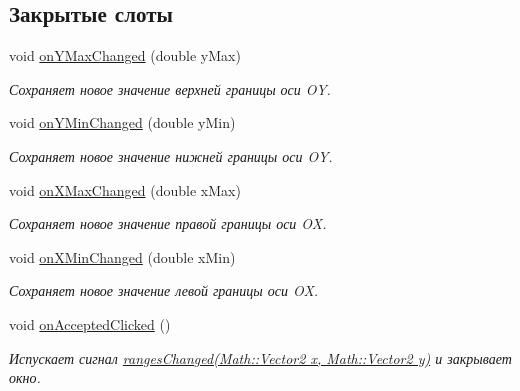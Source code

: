 \subsection*{Закрытые слоты}
\begin{DoxyCompactItemize}
\item 
\hypertarget{class_ranges_dialog_a4b7d45fb0b5f225da1305ef8ce80ad6e}{}\label{class_ranges_dialog_a4b7d45fb0b5f225da1305ef8ce80ad6e} 
void \hyperlink{class_ranges_dialog_a4b7d45fb0b5f225da1305ef8ce80ad6e}{on\+Y\+Max\+Changed} (double y\+Max)
\begin{DoxyCompactList}\small\item\em Сохраняет новое значение верхней границы оси OY. \end{DoxyCompactList}\item 
\hypertarget{class_ranges_dialog_a8f9567a3bc26d5e75c17a0eb85298869}{}\label{class_ranges_dialog_a8f9567a3bc26d5e75c17a0eb85298869} 
void \hyperlink{class_ranges_dialog_a8f9567a3bc26d5e75c17a0eb85298869}{on\+Y\+Min\+Changed} (double y\+Min)
\begin{DoxyCompactList}\small\item\em Сохраняет новое значение нижней границы оси OY. \end{DoxyCompactList}\item 
\hypertarget{class_ranges_dialog_a58929e0764374f0f07406b8a3042bad3}{}\label{class_ranges_dialog_a58929e0764374f0f07406b8a3042bad3} 
void \hyperlink{class_ranges_dialog_a58929e0764374f0f07406b8a3042bad3}{on\+X\+Max\+Changed} (double x\+Max)
\begin{DoxyCompactList}\small\item\em Сохраняет новое значение правой границы оси OX. \end{DoxyCompactList}\item 
\hypertarget{class_ranges_dialog_a64b596bcf23ba7e4bc1b94b60e0b64d0}{}\label{class_ranges_dialog_a64b596bcf23ba7e4bc1b94b60e0b64d0} 
void \hyperlink{class_ranges_dialog_a64b596bcf23ba7e4bc1b94b60e0b64d0}{on\+X\+Min\+Changed} (double x\+Min)
\begin{DoxyCompactList}\small\item\em Сохраняет новое значение левой границы оси OX. \end{DoxyCompactList}\item 
\hypertarget{class_ranges_dialog_af9c1d18ebe5c3d31135f5fc448a78197}{}\label{class_ranges_dialog_af9c1d18ebe5c3d31135f5fc448a78197} 
void \hyperlink{class_ranges_dialog_af9c1d18ebe5c3d31135f5fc448a78197}{on\+Accepted\+Clicked} ()
\begin{DoxyCompactList}\small\item\em Испускает сигнал \hyperlink{class_ranges_dialog_a8d4fb1f4d8bd2e5e3d0bc36f390e4974}{ranges\+Changed(\+Math\+::\+Vector2 x, Math\+::\+Vector2 y)} и закрывает окно. \end{DoxyCompactList}\item 

\end{DoxyCompactItemize}
